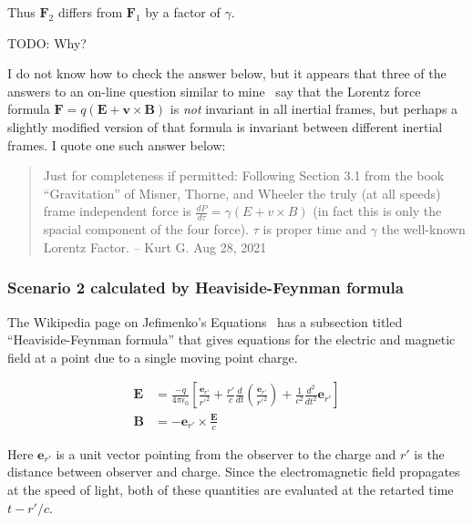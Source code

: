 \documentclass[a4paper]{article}
\theoremstyle{plain}
\theoremstyle{definition}
\newcommand{\vect}[1]{\mathbf{#1}}
\begin{document}
Thus $\vect{F}_2$ differs from $\vect{F}_1$ by a factor of $\gamma$.

TODO: Why?

I do not know how to check the answer below, but it appears that three
of the answers to an on-line question similar to
mine~\cite{PhysicsSEIsLorentzForceFrameIndependent} say that the
Lorentz force formula $\vect{F} = q(\vect{E} + \vect{v} \times
\vect{B})$ is {\em not} invariant in all inertial frames, but perhaps
a slightly modified version of that formula is invariant between
different inertial frames.  I quote one such answer below:

\begin{quote}
Just for completeness if permitted: Following Section 3.1 from the
book ``Gravitation'' of Misner, Thorne, and Wheeler the truly (at all
speeds) frame independent force is $\frac{dP}{d \tau} = \gamma (E + v
\times B)$ (in fact this is only the spacial component of the four
force).  $\tau$ is proper time and $\gamma$ the well-known Lorentz
Factor. -- Kurt G. Aug 28, 2021
\end{quote}


\subsubsection{Scenario 2 calculated by Heaviside-Feynman formula}

The Wikipedia page on Jefimenko's Equations~\cite{JefimenkosEquations}
has a subsection titled ``Heaviside-Feynman formula'' that gives
equations for the electric and magnetic field at a point due to a
single moving point charge.

\begin{align}
\vect{E} & = \frac{-q}{4 \pi \epsilon_0}
             \left[
               \frac{\vect{e}_{r'}}{r'^2}
               + \frac{r'}{c} \frac{d}{dt} \left( \frac{\vect{e}_{r'}}{r'^2} \right)
               + \frac{1}{c^2} \frac{d^2}{dt^2} \vect{e}_{r'}
             \right]
             \label{eq:HF-EforPtChg} \\
\vect{B} & = - \vect{e}_{r'} \times \frac{\vect{E}}{c}
             \label{eq:HF-BforPtChg}
\end{align}

Here $\vect{e}_{r'}$ is a unit vector pointing from the observer to
the charge and $r'$ is the distance between observer and charge.
Since the electromagnetic field propagates at the speed of light, both
of these quantities are evaluated at the retarted time $t - r'/c$.
\end{document}
